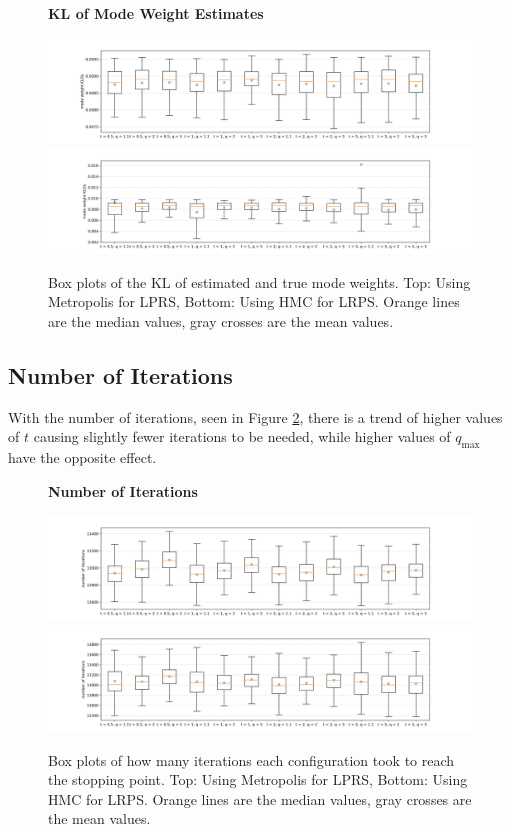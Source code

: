 \documentclass[12pt, a4paper]{report}
\begin{document}
\begin{figure}
    \centering
    {\small \textbf{KL of Mode Weight Estimates} \par}
    \includegraphics[trim={3cm 0cm 3cm 0cm}, clip, width=\textwidth]{figs/results/params/KLDs_metropolis.png}
    \includegraphics[trim={2cm 0cm 3cm 0cm}, clip, width=\textwidth]{figs/results/params/KLDs_hmc.png}
    \caption{Box plots of the KL of estimated and true mode weights. Top: Using Metropolis for LPRS, Bottom: Using HMC for LRPS. Orange lines are the median values, gray crosses are the mean values.}
    \label{fig:results_params_KLDs}
\end{figure}

\subsection{Number of Iterations}
With the number of iterations, seen in Figure \ref{fig:results_params_iterations}, there is a trend of higher values of $t$ causing slightly fewer iterations to be needed, while higher values of $q_{\textrm{max}}$ have the opposite effect.
\begin{figure}
    \centering
    {\small \textbf{Number of Iterations} \par}
    \includegraphics[trim={3cm 0cm 3cm 0cm}, clip, width=\textwidth]{figs/results/params/iterations_metropolis.png}
    \includegraphics[trim={3cm 0cm 3cm 0cm}, clip, width=\textwidth]{figs/results/params/iterations_hmc.png}
    \caption{Box plots of how many iterations each configuration took to reach the stopping point. Top: Using Metropolis for LPRS, Bottom: Using HMC for LRPS. Orange lines are the median values, gray crosses are the mean values.}
    \label{fig:results_params_iterations}
\end{figure}
\end{document}
